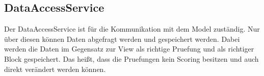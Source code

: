 \subsection{DataAccessService}\label{subsec:dataaccessservice}
Der DataAccessService ist für die Kommunikation mit dem Model zuständig.
Nur über diesen können Daten abgefragt werden und gespeichert werden.
Dabei werden die Daten im Gegensatz zur View als richtige Pruefung und als richtiger Block gespeichert.
Das heißt, dass die Pruefungen kein Scoring besitzen und auch direkt verändert werden können.


